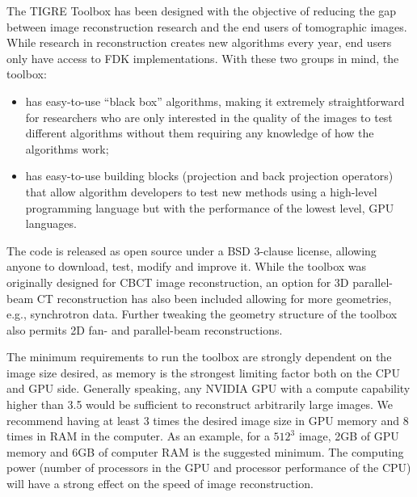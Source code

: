 The TIGRE Toolbox has been designed with the objective of reducing the gap between image reconstruction research and the end users of tomographic images. While research in reconstruction creates new algorithms every year, end users only have access to FDK implementations. With these two groups in mind, the toolbox:
\begin{itemize}
\item has easy-to-use ``black box'' algorithms, making it extremely straightforward for researchers who are only interested in the quality of the images to test different algorithms without them requiring any knowledge of how the algorithms work;
\item has easy-to-use building blocks (projection and back projection operators) that allow algorithm developers to test new methods using a high-level programming language but with the performance of the lowest level, GPU languages.
\end{itemize}
The code is released as open source under a BSD 3-clause license, allowing anyone to download, test, modify and improve it. While the toolbox was originally designed for CBCT image reconstruction, an option for 3D parallel-beam CT reconstruction has also been included allowing for more geometries, e.g., synchrotron data. Further tweaking the geometry structure of the toolbox also permits 2D fan- and parallel-beam reconstructions.


The minimum requirements to run the toolbox are strongly dependent on the image size desired, as memory is the strongest limiting factor both on the CPU and GPU side. Generally speaking, any NVIDIA GPU with a compute capability higher than 3.5 would be sufficient to reconstruct arbitrarily large images. We recommend having at least 3 times the desired image size in GPU memory and 8 times in RAM in the computer. As an example, for a $512^3$ image, 2GB of GPU memory and 6GB of computer RAM is the suggested minimum. The computing power (number of processors in the GPU and processor performance of the CPU) will have a strong effect on the speed of image reconstruction. 




